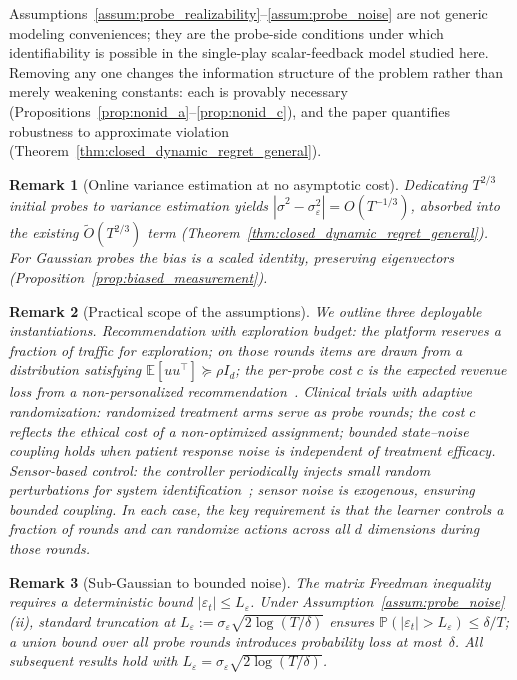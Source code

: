 \documentclass[11pt]{article}
\newcommand{\E}{\mathbb{E}}
\newcommand{\Prob}{\mathbb{P}}
\newtheorem{remark}{Remark}
\begin{document}
Assumptions~\ref{assum:probe_realizability}--\ref{assum:probe_noise} are not generic
modeling conveniences; they are the probe-side conditions under which identifiability
is possible in the single-play scalar-feedback model studied here.
Removing any one changes the information structure of the problem rather than merely
weakening constants: each is provably necessary
(Propositions~\ref{prop:nonid_a}--\ref{prop:nonid_c}), and the paper quantifies
robustness to approximate violation
(Theorem~\ref{thm:closed_dynamic_regret_general}).

\begin{remark}[Online variance estimation at no asymptotic cost]
\label{rem:burnin_free}
Dedicating $T^{2/3}$ initial probes to variance estimation yields
$|\hat\sigma^2-\sigma_\varepsilon^2|=O(T^{-1/3})$, absorbed into the existing
$\widetilde{O}(T^{2/3})$ term
(Theorem~\ref{thm:closed_dynamic_regret_general}).
For Gaussian probes the bias is a scaled identity, preserving eigenvectors
(Proposition~\ref{prop:biased_measurement}).
\end{remark}

\begin{remark}[Practical scope of the assumptions]
\label{rem:practical_scope}
We outline three deployable instantiations.
\emph{Recommendation with exploration budget:} the platform reserves a fraction of
traffic for exploration; on those rounds items are drawn from a distribution satisfying
$\E[uu^\top]\succeq\rho I_d$; the per-probe cost $c$ is the expected revenue loss from
a non-personalized recommendation~\citep{li2010contextual}.
\emph{Clinical trials with adaptive randomization:} randomized treatment arms serve as
probe rounds; the cost $c$ reflects the ethical cost of a non-optimized assignment;
bounded state--noise coupling holds when patient response noise is independent of
treatment efficacy.
\emph{Sensor-based control:} the controller periodically injects small random
perturbations for system identification~\citep{memmel2024asid}; sensor noise is
exogenous, ensuring bounded coupling.
In each case, the key requirement is that the learner controls a fraction of rounds
and can randomize actions across all $d$ dimensions during those rounds.
\end{remark}

\begin{remark}[Sub-Gaussian to bounded noise]
\label{rem:truncation}
The matrix Freedman inequality requires a deterministic bound
$|\varepsilon_t|\le L_\varepsilon$.
Under Assumption~\ref{assum:probe_noise}(ii), standard truncation at
$L_\varepsilon := \sigma_\varepsilon\sqrt{2\log(T/\delta)}$ ensures
$\Prob(|\varepsilon_t|>L_\varepsilon)\le\delta/T$; a union bound over all probe
rounds introduces probability loss at most~$\delta$.
All subsequent results hold with $L_\varepsilon=\sigma_\varepsilon\sqrt{2\log(T/\delta)}$.
\end{remark}
\end{document}

